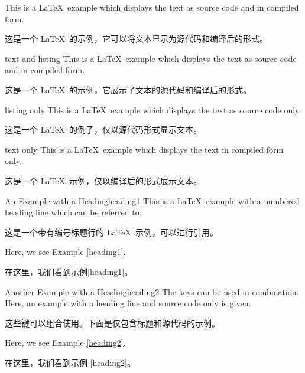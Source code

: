 \begin{dispExample}
\begin{texexp}{}
This is a \LaTeX\ example which displays the text as source code
and in compiled form.

这是一个 \LaTeX\ 的示例，它可以将文本显示为源代码和编译后的形式。
\end{texexp}
\end{dispExample}


\begin{dispExample}
\begin{texexp}{text and listing}
This is a \LaTeX\ example which displays the text as source code
and in compiled form.

这是一个 \LaTeX\ 的示例，它展示了文本的源代码和编译后的形式。
\end{texexp}
\end{dispExample}


\begin{dispExample}
\begin{texexp}{listing only}
This is a \LaTeX\ example which displays the text as source code only.

这是一个 \LaTeX\ 的例子，仅以源代码形式显示文本。
\end{texexp}
\end{dispExample}


\begin{dispExample}
\begin{texexp}{text only}
This is a \LaTeX\ example which displays the text in compiled form only.

这是一个 \LaTeX\ 示例，仅以编译后的形式展示文本。
\end{texexp}
\end{dispExample}


\begin{dispExample}
\begin{texexptitled}{An Example with a Heading}{heading1}
This is a \LaTeX\ example with a numbered heading line
which can be referred to.

这是一个带有编号标题行的 \LaTeX\ 示例，可以进行引用。
\end{texexptitled}
Here, we see Example \ref{heading1}.

在这里，我们看到示例\ref{heading1}。
\end{dispExample}


\begin{dispExample}
\begin{texexptitled}{Another Example with a Heading}{heading2}
The keys can be used in combination. Here, an example with a heading line
and source code only is given.

这些键可以组合使用。下面是仅包含标题和源代码的示例。
\end{texexptitled}
Here, we see Example \ref{heading2}.

在这里，我们看到示例 \ref{heading2}。
\end{dispExample}



